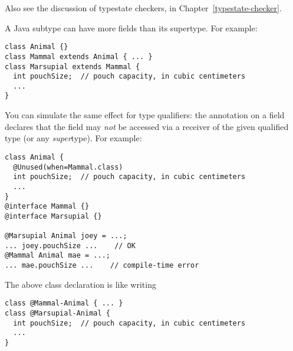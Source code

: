 


Also see the discussion of typestate checkers, in
Chapter~\ref{typestate-checker}.



A Java subtype can have more fields than its supertype.  For example:

\begin{Verbatim}
class Animal {}
class Mammal extends Animal { ... }
class Marsupial extends Mammal {
  int pouchSize;  // pouch capacity, in cubic centimeters
  ...
}
\end{Verbatim}

You can simulate
the same effect for type qualifiers:
the  annotation
on a field declares that the field may \emph{not} be accessed via a receiver of
the given qualified type (or any \emph{super}type).
For example:

\begin{Verbatim}
class Animal {
  @Unused(when=Mammal.class)
  int pouchSize;  // pouch capacity, in cubic centimeters
  ...
}
@interface Mammal {}
@interface Marsupial {}

@Marsupial Animal joey = ...;
... joey.pouchSize ...    // OK
@Mammal Animal mae = ...;
... mae.pouchSize ...    // compile-time error
\end{Verbatim}

The above class declaration is like writing

\begin{Verbatim}
class @Mammal-Animal { ... }
class @Marsupial-Animal {
  int pouchSize;  // pouch capacity, in cubic centimeters
  ...
}
\end{Verbatim}


